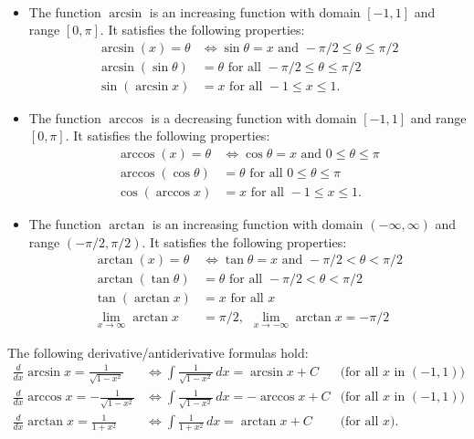 \begin{namedtheorem}\
  \begin{itemize}
    \item The function $\arcsin$ is an increasing function with domain $[-1,1]$ and range $[0,\pi]$. It satisfies the following properties:
    \begin{align*}
      \arcsin(x)=\theta &\iff \sin\theta=x \text{ and } -\pi/2\leq \theta\leq \pi/2\\
      \arcsin(\sin \theta)&=\theta \text{ for all } -\pi/2\leq \theta\leq \pi/2\\
      \sin(\arcsin x)&=x \text{ for all } -1\leq x\leq 1.
    \end{align*}
    \item The function $\arccos$ is a decreasing function with domain $[-1,1]$ and range $[0,\pi]$. It satisfies the following properties:
    \begin{align*}
      \arccos(x)=\theta &\iff \cos\theta=x \text{ and } 0\leq \theta\leq \pi\\
      \arccos(\cos \theta)&=\theta \text{ for all } 0\leq \theta\leq \pi\\
      \cos(\arccos x)&=x \text{ for all } -1\leq x\leq 1.
    \end{align*}
    \item The function $\arctan$ is an increasing function with domain $(-\infty, \infty)$ and range $(-\pi/2, \pi/2)$. It satisfies the following properties:
    \begin{align*}
      \arctan(x)=\theta &\iff \tan\theta=x \text{ and } -\pi/2< \theta< \pi/2\\
      \arctan(\tan \theta)&=\theta \text{ for all } -\pi/2< \theta< \pi/2\\
      \tan(\arctan x)&=x \text{ for all } x\\
      \lim_{x\to\infty}\arctan x&=\pi/2,\hspace{5pt} \lim_{x\to-\infty}\arctan x=-\pi/2
    \end{align*}
  \end{itemize}

\end{namedtheorem}
\begin{namedtheorem} The following derivative/antiderivative formulas hold:
  \begin{align*}
    \frac{d}{dx} \arcsin x=\frac{1}{\sqrt{1-x^2}}&\iff \int \frac{1}{\sqrt{1-x^2}}\, dx=\arcsin x+C &\text{(for all $x$ in $(-1,1)$)}\\
    \frac{d}{dx} \arccos x=-\frac{1}{\sqrt{1-x^2}}&\iff \int \frac{1}{\sqrt{1-x^2}}\, dx=-\arccos x+C &\text{(for all $x$ in $(-1,1)$)}\\
    \frac{d}{dx} \arctan x=\frac{1}{1+x^2}&\iff \int \frac{1}{1+x^2}\, dx=\arctan x+C &\text{(for all $x$)}.
  \end{align*}

\end{namedtheorem}


